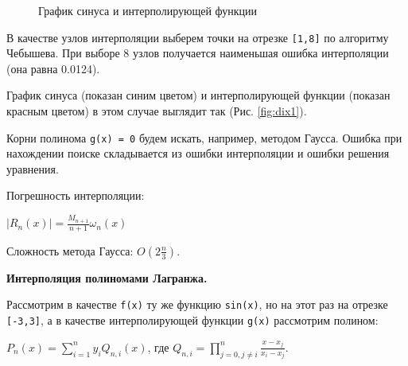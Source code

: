 \documentclass{article}
\begin{document}
				\begin{figure} 
					\caption{График синуса и интерполирующей функции}
					\label{fig:dix2}
				\end{figure}
				
				В качестве узлов интерполяции выберем точки на отрезке \texttt{[1,8]} по алгоритму Чебышева. При выборе 8 узлов получается наименьшая ошибка интерполяции (она равна 0.0124).


								
				График синуса (показан синим цветом) и интерполирующей функции (показан красным цветом) в этом случае выглядит так (Рис. \ref{fig:dix1}).
		
				
				Корни полинома \texttt{g(x) = 0} будем искать, например, методом Гаусса. Ошибка при нахождении поиске складывается из ошибки интерполяции и ошибки решения уравнения.
				
				Погрешность интерполяции: \begin{center}$|R_n(x)| = \frac{M_{n+1}}{n + 1}\omega_n(x)$
				\end{center}
				Сложность метода Гаусса: $O(2\frac{n}{3})$.
				
				\textbf{Интерполяция полиномами Лагранжа.}
				
				Рассмотрим в качестве \texttt{f(x)} ту же функцию \texttt{sin(x)}, но на этот раз на отрезке \texttt{[-3,3]}, а в качестве интерполирующей функции \texttt{g(x)} рассмотрим полином: 
				
				\begin{center}\texttt{$P_n(x) = \sum\limits_{i=1}^ny_iQ_{n,i}(x)$}, где $Q_{n,i} = \prod\limits_{j = 0, j \neq i}^n \frac{x - x_j}{x_i - x_j}$.\end{center}
				
\end{document}
